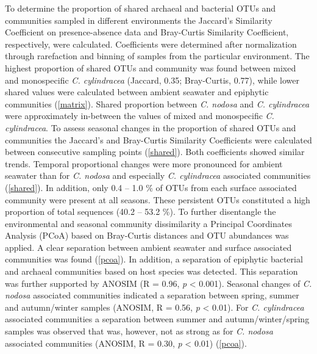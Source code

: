 \documentclass[
  12pt,
]{article}
\begin{document}
To determine the proportion of shared archaeal and bacterial OTUs and
communities sampled in different environments the Jaccard's Similarity
Coefficient on presence-absence data and Bray-Curtis Similarity
Coefficient, respectively, were calculated. Coefficients were determined
after normalization through rarefaction and binning of samples from the
particular environment. The highest proportion of shared OTUs and
community was found between mixed and monospecific \emph{C. cylindracea}
(Jaccard, 0.35; Bray-Curtis, 0.77), while lower shared values were
calculated between ambient seawater and epiphytic communities
(\autoref{matrix}). Shared proportion between \emph{C. nodosa} and
\emph{C. cylindracea} were approximately in-between the values of mixed
and monospecific \emph{C. cylindracea}. To assess seasonal changes in
the proportion of shared OTUs and communities the Jaccard's and
Bray-Curtis Similarity Coefficients were calculated between consecutive
sampling points (\autoref{shared}). Both coefficients showed similar
trends. Temporal proportional changes were more pronounced for ambient
seawater than for \emph{C. nodosa} and especially \emph{C. cylindracea}
associated communities (\autoref{shared}). In addition, only 0.4 -- 1.0
\si{\percent} of OTUs from each surface associated community were
present at all seasons. These persistent OTUs constituted a high
proportion of total sequences (40.2 -- 53.2 \si{\percent}). To further
disentangle the environmental and seasonal community dissimilarity a
Principal Coordinates Analysis (PCoA) based on Bray-Curtis distances and
OTU abundances was applied. A clear separation between ambient seawater
and surface associated communities was found (\autoref{pcoa}). In
addition, a separation of epiphytic bacterial and archaeal communities
based on host species was detected. This separation was further
supported by ANOSIM (R = 0.96, \emph{p} \textless{} 0.001). Seasonal
changes of \emph{C. nodosa} associated communities indicated a
separation between spring, summer and autumn/winter samples (ANOSIM, R =
0.56, \emph{p} \textless{} 0.01). For \emph{C. cylindracea} associated
communities a separation between summer and autumn/winter/spring samples
was observed that was, however, not as strong as for \emph{C. nodosa}
associated communities (ANOSIM, R = 0.30, \emph{p} \textless{} 0.01)
(\autoref{pcoa}).
\end{document}

